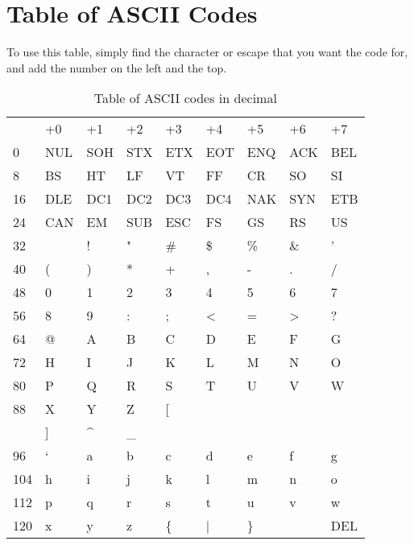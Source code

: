 \chapter{Table of ASCII Codes}
\label{asciilisting}

% 
% 
% 
% 

To use this table, simply find the character or escape that you want the
code for, and add the number on the left and the top.

\begin{table}[h]
\begin{tabular}{l | l | l | l | l | l | l | l | l}

 & +0 & +1 & +2 & +3 & +4 & +5 & +6 & +7 \\
0 & NUL & SOH & STX & ETX & EOT & ENQ & ACK & BEL \\
8 & BS & HT & LF & VT & FF & CR & SO & SI \\
16 & DLE & DC1 & DC2 & DC3 & DC4 & NAK & SYN & ETB \\
24 & CAN & EM & SUB & ESC & FS & GS & RS & US \\
32 &  & ! & " & \# & \$ & \% & \& & ' \\
40 & ( & ) & * & + & , & - & . & / \\
48 & 0 & 1 & 2 & 3 & 4 & 5 & 6 & 7 \\
56 & 8 & 9 & : & ; & < & = & > & ? \\
64 & @ & A & B & C & D & E & F & G \\
72 & H & I & J & K & L & M & N & O \\
80 & P & Q & R & S & T & U & V & W \\
88 & X & Y & Z & [ & \\ & ] & \textasciicircum & \_ \\
96 & ` & a & b & c & d & e & f & g \\
104 & h & i & j & k & l & m & n & o \\
112 & p & q & r & s & t & u & v & w \\
120 & x & y & z & \{ & | & \} & ~ & DEL \\
\end{tabular}
\caption{Table of ASCII codes in decimal}
\end{table}

